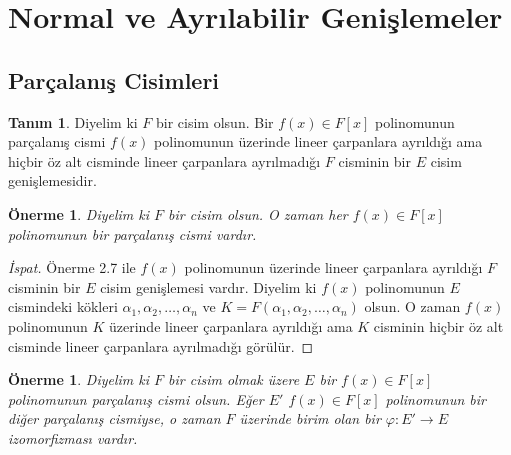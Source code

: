 \documentclass[draft]{article}
\newtheorem{prop}[thm]{Önerme}
\theoremstyle{definition}
\newtheorem{defn}{Tanım}[section]
\theoremstyle{remark}
\begin{document}
	\section{Normal ve Ayrılabilir Genişlemeler}
	
    	\subsection{Parçalanış Cisimleri}
    	
        	\begin{defn}
    	        Diyelim ki $F$ bir cisim olsun. Bir $f(x) \in F[x]$ polinomunun parçalanış cismi $f(x)$ polinomunun üzerinde lineer çarpanlara ayrıldığı ama hiçbir öz alt cisminde lineer çarpanlara ayrılmadığı $F$ cisminin bir $E$ cisim genişlemesidir.
    	    \end{defn}
    	    
    	    \begin{prop}
    	        Diyelim ki $F$ bir cisim olsun. O zaman her $f(x) \in F[x]$ polinomunun bir parçalanış cismi vardır.
    	    \end{prop}
    	    
    	    \begin{proof}[İspat]
    	        Önerme 2.7 ile $f(x)$ polinomunun üzerinde lineer çarpanlara ayrıldığı $F$ cisminin bir $E$ cisim genişlemesi vardır. Diyelim ki $f(x)$ polinomunun $E$ cismindeki kökleri $\alpha_1, \alpha_2, \dots, \alpha_n$ ve $K = F(\alpha_1, \alpha_2, \dots, \alpha_n)$ olsun. O zaman $f(x)$ polinomunun $K$ üzerinde lineer çarpanlara ayrıldığı ama $K$ cisminin hiçbir öz alt cisminde lineer çarpanlara ayrılmadığı görülür.
    	    \end{proof}
    	    
    	    \begin{prop}
    	        Diyelim ki $F$ bir cisim olmak üzere $E$ bir $f(x) \in F[x]$ polinomunun parçalanış cismi olsun. Eğer $E'$ $f(x) \in F[x]$ polinomunun bir diğer parçalanış cismiyse, o zaman $F$ üzerinde birim olan bir $\varphi: E' \to E$ izomorfizması vardır.
    		\end{prop}
    		
\end{document}
